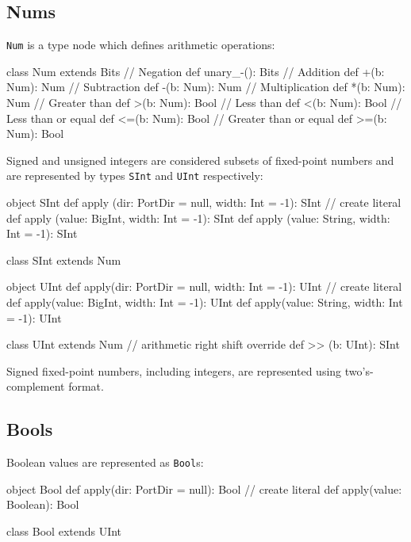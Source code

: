 \documentclass[10pt,twocolumn]{article}
\def\code#1{{\small\tt #1}}
\begin{document}
\subsection{Nums}

\code{Num} is a type node which defines arithmetic operations:

\begin{scala}
class Num extends Bits {
  // Negation
  def unary_-(): Bits
  // Addition
  def +(b: Num): Num
  // Subtraction
  def -(b: Num): Num
  // Multiplication
  def *(b: Num): Num
  // Greater than
  def >(b: Num): Bool
  // Less than
  def <(b: Num): Bool
  // Less than or equal
  def <=(b: Num): Bool
  // Greater than or equal
  def >=(b: Num): Bool
}
\end{scala}


Signed and unsigned integers
are considered subsets of fixed-point numbers and are represented by
types \code{SInt} and \code{UInt} respectively:

\begin{scala}
object SInt {
  def apply (dir: PortDir = null, 
             width: Int = -1): SInt
  // create literal
  def apply (value: BigInt, width: Int = -1): SInt
  def apply (value: String, width: Int = -1): SInt
}

class SInt extends Num 

object UInt {
  def apply(dir: PortDir = null,
            width: Int = -1): UInt
  // create literal
  def apply(value: BigInt, width: Int = -1): UInt
  def apply(value: String, width: Int = -1): UInt
}

class UInt extends Num {
  // arithmetic right shift
  override def >> (b: UInt): SInt
}
\end{scala}

\noindent
Signed fixed-point
numbers, including integers, are represented using two's-complement
format.  

\subsection{Bools}

Boolean values are represented as \code{Bool}s:

\begin{scala}
object Bool {
  def apply(dir: PortDir = null): Bool
  // create literal
  def apply(value: Boolean): Bool
}

class Bool extends UInt
\end{scala}
\end{document}
